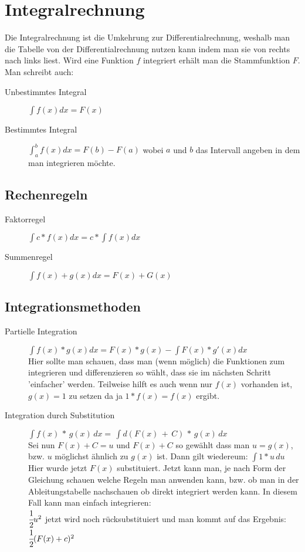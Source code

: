 \documentclass[a4paper]{scrartcl}
\begin{document}
    \section{Integralrechnung}
        Die Integralrechnung ist die Umkehrung zur Differentialrechnung, weshalb man die Tabelle von der Differentialrechnung nutzen kann indem man sie von rechts nach links liest.
        Wird eine Funktion $f$ integriert erhält man die Stammfunktion $F$. Man schreibt auch:
        \begin{description}
            \item[Unbestimmtes Integral] $\int f(x) dx = F(x)$
            \item[Bestimmtes Integral] $\int_{a}^{b} f(x) dx = F(b) - F(a)$  wobei $a$ und $b$ das Intervall angeben in dem man integrieren möchte. 
        \end{description}
        \subsection{Rechenregeln}
            \begin{description}
                \item[Faktorregel] $\int c * f(x) dx = c * \int f(x) dx$ 
                \item[Summenregel] $\int f(x) + g(x) dx = F(x) + G(x)$  
            \end{description}
        \newpage
        \subsection{Integrationsmethoden}
        \begin{description}
            \item[Partielle Integration] $\int f(x) * g(x) dx = F(x) * g(x) - \int F(x) * g'(x) dx$ \\
             Hier sollte man schauen, dass man (wenn möglich) die Funktionen zum integrieren und differenzieren so wählt, dass sie im nächsten Schritt 'einfacher' werden.  
             Teilweise hilft es auch wenn nur $f(x)$ vorhanden ist, $g(x) = 1$ zu setzen da ja $1 * f(x) = f(x)$ ergibt.
             \item[Integration durch Substitution] $\int f(x)\, * \,g(x)\, dx = \,\int d(F(x) \,+ \,C) \,* \,g(x) \,dx$ 
             \\Sei nun $F(x) + C = u$  und $F(x) + C$ so gewählt dass man $u = g(x)$, 
            bzw. $u$ möglichst ähnlich zu $g(x)$ ist. Dann gilt wiedereum: $\int 1 * u \,du $ 
            \\Hier wurde jetzt $F(x)$ substituiert. Jetzt kann man, je nach Form der Gleichung schauen welche Regeln man anwenden kann, bzw. ob man in der Ableitungstabelle nachschauen ob direkt integriert werden kann.
            In diesem Fall kann man einfach integrieren: \\$\cfrac{1}{2}u^2$ jetzt wird noch rücksubstituiert und man kommt auf das Ergebnis: $\cfrac{1}{2}(F(x) + c)^2$
        \end{description}
\end{document}
